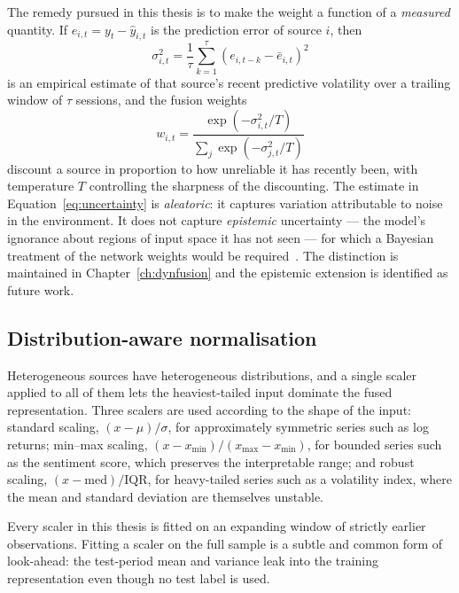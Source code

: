 The remedy pursued in this thesis is to make the weight a function of a \emph{measured}
quantity. If $e_{i,t} = y_t - \hat{y}_{i,t}$ is the prediction error of source $i$, then
\begin{equation}
\sigma_{i,t}^2 = \frac{1}{\tau}\sum_{k=1}^{\tau}\left(e_{i,t-k} - \bar{e}_{i,t}\right)^2
\label{eq:uncertainty}
\end{equation}
is an empirical estimate of that source's recent predictive volatility over a trailing window
of $\tau$ sessions, and the fusion weights
\begin{equation}
w_{i,t} = \frac{\exp\!\left(-\sigma_{i,t}^2 / T\right)}
               {\sum_j \exp\!\left(-\sigma_{j,t}^2 / T\right)}
\label{eq:softmaxweights}
\end{equation}
discount a source in proportion to how unreliable it has recently been, with temperature $T$
controlling the sharpness of the discounting. The estimate in Equation~\eqref{eq:uncertainty} is
\emph{aleatoric}: it captures variation attributable to noise in the environment. It does not
capture \emph{epistemic} uncertainty --- the model's ignorance about regions of input space it
has not seen --- for which a Bayesian treatment of the network weights would be
required~\cite{gal2016dropout,kendall2017}. The distinction is maintained in
Chapter~\ref{ch:dynfusion} and the epistemic extension is identified as future work.

\subsection{Distribution-aware normalisation}

Heterogeneous sources have heterogeneous distributions, and a single scaler applied to all of
them lets the heaviest-tailed input dominate the fused representation. Three scalers are used
according to the shape of the input: standard scaling, $(x - \mu)/\sigma$, for approximately
symmetric series such as log returns; min--max scaling, $(x - x_{\min})/(x_{\max} - x_{\min})$,
for bounded series such as the sentiment score, which preserves the interpretable range; and
robust scaling, $(x - \mathrm{med})/\mathrm{IQR}$, for heavy-tailed series such as a volatility
index, where the mean and standard deviation are themselves unstable.

Every scaler in this thesis is fitted on an expanding window of strictly earlier observations.
Fitting a scaler on the full sample is a subtle and common form of look-ahead: the test-period
mean and variance leak into the training representation even though no test label is used.

